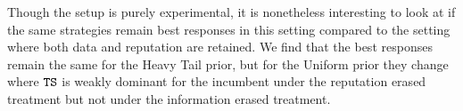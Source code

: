 \documentclass[../competing_bandits.tex]{subfiles}
\begin{document}
Though the setup is purely experimental, it is nonetheless interesting to look at if the same strategies remain best responses in this setting compared to the setting where both data and reputation are retained. We find that the best responses remain the same for the Heavy Tail prior, but for the Uniform prior they change where $\mathtt{TS}$ is weakly dominant for the incumbent under the reputation erased treatment but not under the information erased treatment.
\end{document}
